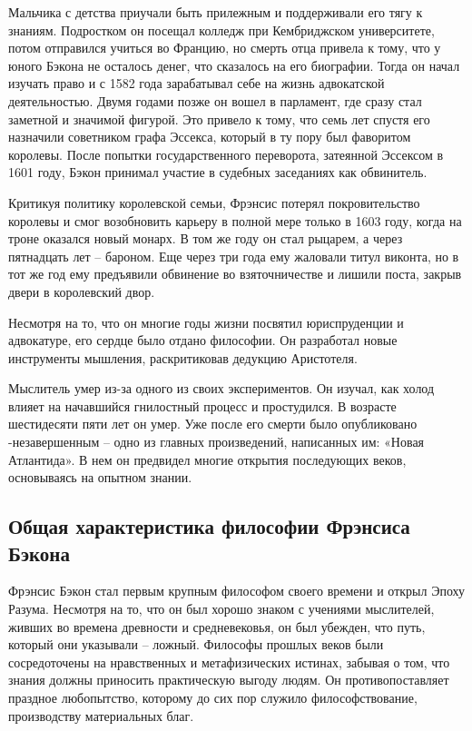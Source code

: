 \documentclass[
]{article}
\begin{document}
Мальчика с детства приучали быть прилежным и поддерживали его тягу к
знаниям. Подростком он посещал колледж при Кембриджском университете,
потом отправился учиться во Францию, но смерть отца привела к тому, что
у юного Бэкона не осталось денег, что сказалось на его биографии. Тогда
он начал изучать право и с 1582 года зарабатывал себе на жизнь
адвокатской деятельностью. Двумя годами позже он вошел в парламент, где
сразу стал заметной и значимой фигурой. Это привело к тому, что семь лет
спустя его назначили советником графа Эссекса, который в ту пору был
фаворитом королевы. После попытки государственного переворота, затеянной
Эссексом в 1601 году, Бэкон принимал участие в судебных заседаниях как
обвинитель.

Критикуя политику королевской семьи, Фрэнсис потерял покровительство
королевы и смог возобновить карьеру в полной мере только в 1603 году,
когда на троне оказался новый монарх. В том же году он стал рыцарем, а
через пятнадцать лет -- бароном. Еще через три года ему жаловали титул
виконта, но в тот же год ему предъявили обвинение во взяточничестве и
лишили поста, закрыв двери в королевский двор.

Несмотря на то, что он многие годы жизни посвятил юриспруденции и
адвокатуре, его сердце было отдано философии. Он разработал новые
инструменты мышления, раскритиковав дедукцию Аристотеля.

Мыслитель умер из-за одного из своих экспериментов. Он изучал, как холод
влияет на начавшийся гнилостный процесс и простудился. В возрасте
шестидесяти пяти лет он умер. Уже после его смерти было опубликовано
-незавершенным -- одно из главных произведений, написанных им: «Новая
Атлантида». В нем он предвидел многие открытия последующих веков,
основываясь на опытном знании.

\hypertarget{ux43eux431ux449ux430ux44f-ux445ux430ux440ux430ux43aux442ux435ux440ux438ux441ux442ux438ux43aux430-ux444ux438ux43bux43eux441ux43eux444ux438ux438-ux444ux440ux44dux43dux441ux438ux441ux430-ux431ux44dux43aux43eux43dux430}{%
\subsection{Общая характеристика философии Фрэнсиса
Бэкона}\label{ux43eux431ux449ux430ux44f-ux445ux430ux440ux430ux43aux442ux435ux440ux438ux441ux442ux438ux43aux430-ux444ux438ux43bux43eux441ux43eux444ux438ux438-ux444ux440ux44dux43dux441ux438ux441ux430-ux431ux44dux43aux43eux43dux430}}

Фрэнсис Бэкон стал первым крупным философом своего времени и открыл
Эпоху Разума. Несмотря на то, что он был хорошо знаком с учениями
мыслителей, живших во времена древности и средневековья, он был убежден,
что путь, который они указывали -- ложный. Философы прошлых веков были
сосредоточены на нравственных и метафизических истинах, забывая о том,
что знания должны приносить практическую выгоду людям. Он
противопоставляет праздное любопытство, которому до сих пор служило
философствование, производству материальных благ.
\end{document}

